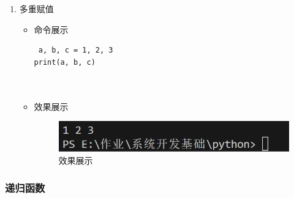 \documentclass[UTF8]{ctexart}
\begin{document}
\begin{enumerate}
  \item 多重赋值 
  \begin{itemize}
  \item 命令展示
  \begin{verbatim}
 a, b, c = 1, 2, 3
print(a, b, c)

    
  \end{verbatim}

  \item 效果展示
  \begin{figure}[H]
    \centering
    \includegraphics[width=\textwidth]{27} %
    \caption{效果展示}
  
  \end{figure}
\end{itemize}
\end{enumerate}




















\subsubsection{递归函数}
\end{document}
